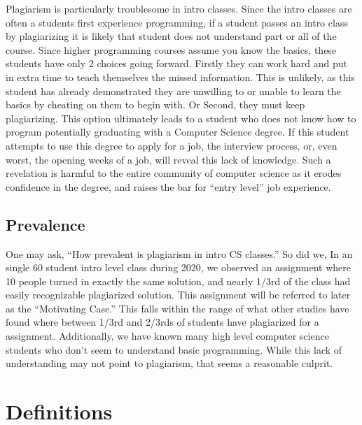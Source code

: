 \documentclass[10pt]{article}
\begin{document}
		Plagiarism is particularly troublesome in intro classes.  Since the intro classes are often a students first experience programming, if a student passes an intro class by plagiarizing it is likely that student does not understand part or all of the course.  Since higher programming courses assume you know the basics, these students have only 2 choices going forward.  Firstly they can work hard and put in extra time to teach themselves the missed information.  This is unlikely, as this student has already demonstrated they are unwilling to or unable to learn the basics by cheating on them to begin with.
		Or Second, they must keep plagiarizing.  This option ultimately leads to a student who does not know how to program potentially graduating with a Computer Science degree.  If this student attempts to use this degree to apply for a job, the interview process, or, even worst, the opening weeks of a job, will reveal this lack of knowledge.  Such a revelation is harmful to the entire community of computer science as it erodes confidence in the degree, and raises the bar for ``entry level'' job experience.
		\subsection{Prevalence}
		
		 One may ask, ``How prevalent is plagiarism in intro CS classes.'' So did we, In an single 60 student intro level  class during 2020, we observed an assignment where 10 people turned in exactly the same solution, and nearly 1/3rd of the class had easily recognizable plagiarized solution.   This assignment will be referred to later as the ``Motivating Case.''
		 This falls within  the range of what other studies have found where between 1/3rd and 2/3rds of students have plagiarized for a assignment\cite{attitude}\cite{prevalent}.
		 Additionally, we have known many high level computer science students who don't seem to understand basic programming.  While this lack of understanding may not point to plagiarism, that seems a reasonable culprit.
		

\section{Definitions}
\end{document}

